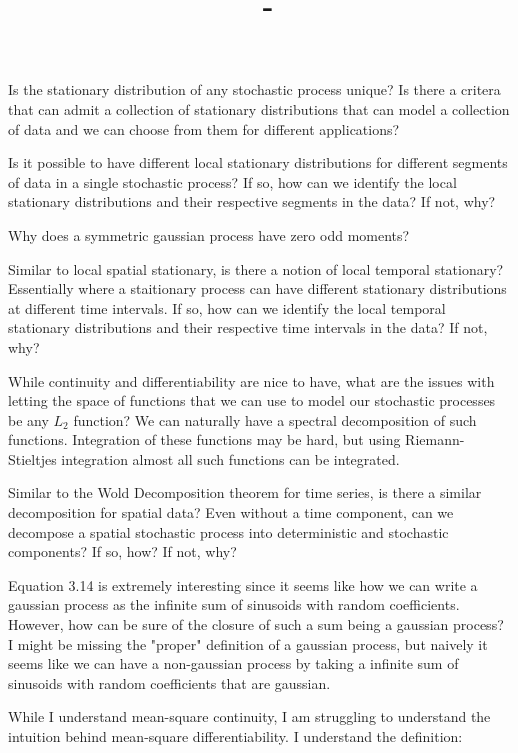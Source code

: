 \documentclass[answers,12pt,addpoints]{exam}
\author{\name}
\title{\course \ - \assignment}
\begin{document}
\maketitle

\begin{questions}
\question Is the stationary distribution of any stochastic process unique? Is there a critera that can admit a collection of stationary distributions that can model a collection of data and we can choose from them for different applications?

\question Is it possible to have different local stationary distributions for different segments of data in a single stochastic process? If so, how can we identify the local stationary distributions and their respective segments in the data? If not, why?

\question Why does a symmetric gaussian process have zero odd moments? 

\question Similar to local spatial stationary, is there a notion of local temporal stationary? Essentially where a staitionary process can have different stationary distributions at different time intervals. If so, how can we identify the local temporal stationary distributions and their respective time intervals in the data? If not, why?

\question While continuity and differentiability are nice to have, what are the issues with letting the space of functions that we can use to model our stochastic processes be any $L_2$ function? We can naturally have a spectral decomposition of such functions. Integration of these functions may be hard, but using Riemann-Stieltjes integration almost all such functions can be integrated. 

\question Similar to the Wold Decomposition theorem for time series, is there a similar decomposition for spatial data? Even without a time component, can we decompose a spatial stochastic process into deterministic and stochastic components? If so, how? If not, why?

\question Equation 3.14 is extremely interesting since it seems like how we can write a gaussian process as the infinite sum of sinusoids with random coefficients. However, how can be sure of the closure of such a sum being a gaussian process? 
I might be missing the "proper" definition of a gaussian process, but naively it seems like we can have a non-gaussian process by taking a infinite sum of sinusoids with random coefficients that are gaussian. 

\question While I understand mean-square continuity, I am struggling to understand the intuition behind mean-square differentiability. I understand the definition: 


\end{questions}
\end{document}
